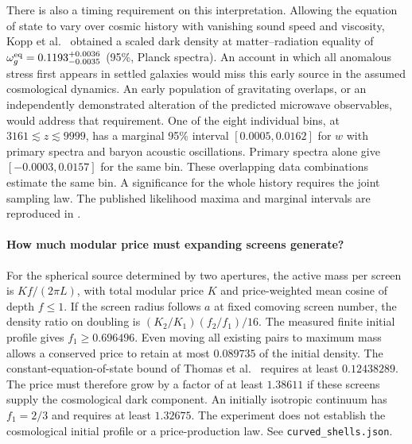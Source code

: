\documentclass[11pt]{article}
\begin{document}
There is also a timing requirement on this interpretation. Allowing
the equation of state to vary over cosmic history with vanishing
sound speed and viscosity, Kopp et al.~\cite{koppHistory} obtained
a scaled dark density at matter--radiation equality of
$\omega_g^{\rm eq}=0.1193^{+0.0036}_{-0.0035}$ (95\%, Planck
spectra). An account in which all anomalous stress first appears in
settled galaxies would miss this early source in the assumed
cosmological dynamics. An early population of gravitating overlaps,
or an independently demonstrated alteration of the predicted
microwave observables, would address that requirement.
One of the eight individual bins, at $3161\lesssim z\lesssim9999$,
has a marginal 95\% interval $[0.0005,0.0162]$ for $w$ with
primary spectra and baryon acoustic oscillations. Primary spectra
alone give $[-0.0003,0.0157]$ for the same bin. These overlapping
data combinations estimate the same bin. A significance for the
whole history requires the joint sampling law. The published likelihood
maxima and marginal intervals are reproduced in
.

\paragraph{How much modular price must expanding screens generate?}
For the spherical source determined by two apertures, the active mass per
screen is $Kf/(2\pi L)$, with total modular price $K$ and price-weighted
mean cosine of depth $f\leq 1$. If the screen radius follows $a$ at fixed
comoving screen number, the density ratio on doubling is
$(K_2/K_1)(f_2/f_1)/16$. The measured finite initial profile gives
$f_1\geq0.696496$. Even moving all existing pairs to maximum mass allows a
conserved price to retain at most $0.089735$ of the initial density. The
constant-equation-of-state bound of Thomas et al.~\cite{thomasGDM} requires
at least $0.12438289$. The price must therefore grow by a factor of at
least $1.38611$ if these screens supply the cosmological dark component.
An initially isotropic continuum has $f_1=2/3$ and requires at least
$1.32675$. The experiment does not establish the cosmological initial
profile or a price-production law. See \texttt{curved\_shells.json}.
\end{document}
